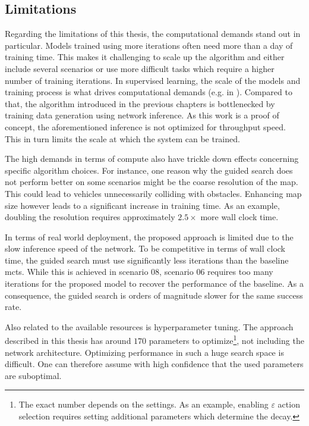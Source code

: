\subsection{Limitations}\label{ssec:limitations}
Regarding the limitations of this thesis, the computational demands stand out in particular. Models trained using more iterations often need more than a day of training time. This makes it challenging to scale up the algorithm and either include several scenarios or use more difficult tasks which require a higher number of training iterations. In supervised learning, the scale of the models and training process is what drives computational demands (e.g. in \cite{devlinBERTPretrainingDeep2019}). Compared to that, the algorithm introduced in the previous chapters is bottlenecked by training data generation using network inference. As this work is a proof of concept, the aforementioned inference is not optimized for throughput speed. This in turn limits the scale at which the system can be trained.

The high demands in terms of compute also have trickle down effects concerning specific algorithm choices. For instance, one reason why the guided search does not perform better on some scenarios might be the coarse resolution of the map. This could lead to vehicles unnecessarily colliding with obstacles. Enhancing map size however leads to a significant increase in training time. As an example, doubling the resolution requires approximately $2.5 \times$ more wall clock time.

In terms of real world deployment, the proposed approach is limited due to the slow inference speed of the network. To be competitive in terms of wall clock time, the guided search must use significantly less iterations than the baseline \gls{mcts}. While this is achieved in scenario 08, scenario 06 requires too many iterations for the proposed model to recover the performance of the baseline. As a consequence, the guided search is orders of magnitude slower for the same success rate.

Also related to the available resources is hyperparameter tuning. The approach described in this thesis has around $170$ parameters to optimize\footnote{The exact number depends on the settings. As an example, enabling $\varepsilon$ action selection requires setting additional parameters which determine the decay.}, not including the network architecture. Optimizing performance in such a huge search space is difficult. One can therefore assume with high confidence that the used parameters are suboptimal.

